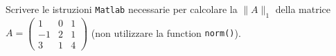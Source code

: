Scrivere le istruzioni {\tt Matlab} necessarie per calcolare la  $\|A\|_1$ della matrice $A = \left( \begin{array}{ccc} 1 & 0 & 1 \\ -1 & 2 & 1 \\ 3 & 1 & 4 \end{array} \right)$ (non utilizzare la function {\tt norm()}). 

